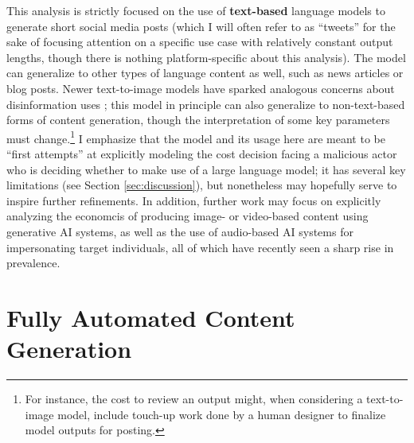 \documentclass{article}
\begin{document}
This analysis is strictly focused on the use of \textbf{text-based} language models to generate short social media posts (which I will often refer to as ``tweets'' for the sake of focusing attention on a specific use case with relatively constant output lengths, though there is nothing platform-specific about this analysis). The model can generalize to other types of language content as well, such as news articles or blog posts. Newer text-to-image models have sparked analogous concerns about disinformation uses \cite{DRI, hwang, wapo}; this model in principle can also generalize to non-text-based forms of content generation, though the interpretation of some key parameters must change.\footnote{For instance, the cost to review an output might, when considering a text-to-image model, include touch-up work done by a human designer to finalize model outputs for posting.} I emphasize that the model and its usage here are meant to be ``first attempts'' at explicitly modeling the cost decision facing a malicious actor who is deciding whether to make use of a large language model; it has several key limitations (see Section \ref{sec:discussion}), but nonetheless may hopefully serve to inspire further refinements. In addition, further work may focus on explicitly analyzing the economcis of producing image- or video-based content using generative AI systems, as well as the use of audio-based AI systems for impersonating target individuals, all of which have recently seen a sharp rise in prevalence. \cite{mcafee, voicescams, videodeepfakes}

\section{Fully Automated Content Generation}
\label{sec:automation}
\end{document}
